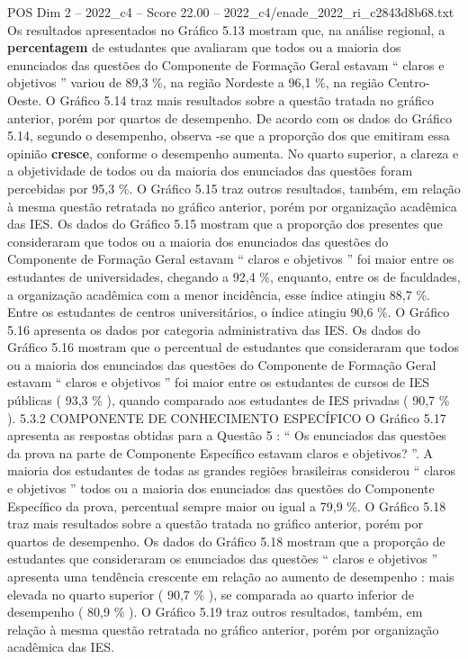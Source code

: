 \begin{textsample}{POS Dim 2 – 2022\_c4 – Score 22.00 – 2022\_c4/enade\_2022\_ri\_c2843d8b68.txt}
Os resultados apresentados no Gráfico 5.13 mostram que, na análise regional, a \textbf{percentagem} de estudantes que avaliaram que todos ou a maioria dos enunciados das questões do Componente de Formação Geral estavam “ claros e objetivos ” variou de 89,3 \%, na região Nordeste a 96,1 \%, na região Centro-Oeste.
O Gráfico 5.14 traz mais resultados sobre a questão tratada no gráfico anterior, porém por quartos de desempenho.
De acordo com os dados do Gráfico 5.14, segundo o desempenho, observa -se que a proporção dos que emitiram essa opinião \textbf{cresce}, conforme o desempenho aumenta.
No quarto superior, a clareza e a objetividade de todos ou da maioria dos enunciados das questões foram percebidas por 95,3 \%.
O Gráfico 5.15 traz outros resultados, também, em relação à mesma questão retratada no gráfico anterior, porém por organização acadêmica das IES.
Os dados do Gráfico 5.15 mostram que a proporção dos presentes que consideraram que todos ou a maioria dos enunciados das questões do Componente de Formação Geral estavam “ claros e objetivos ” foi maior entre os estudantes de universidades, chegando a 92,4 \%, enquanto, entre os de faculdades, a organização acadêmica com a menor incidência, esse índice atingiu 88,7 \%.
Entre os estudantes de centros universitários, o índice atingiu 90,6 \%.
O Gráfico 5.16 apresenta os dados por categoria administrativa das IES.
Os dados do Gráfico 5.16 mostram que o percentual de estudantes que consideraram que todos ou a maioria dos enunciados das questões do Componente de Formação Geral estavam “ claros e objetivos ” foi maior entre os estudantes de cursos de IES públicas ( 93,3 \% ), quando comparado aos estudantes de IES privadas ( 90,7 \% ). 5.3.2 COMPONENTE DE CONHECIMENTO ESPECÍFICO O Gráfico 5.17 apresenta as respostas obtidas para a Questão 5 : “ Os enunciados das questões da prova na parte de Componente Específico estavam claros e objetivos? ”.
A maioria dos estudantes de todas as grandes regiões brasileiras considerou “ claros e objetivos ” todos ou a maioria dos enunciados das questões do Componente Específico da prova, percentual sempre maior ou igual a 79,9 \%.
O Gráfico 5.18 traz mais resultados sobre a questão tratada no gráfico anterior, porém por quartos de desempenho.
Os dados do Gráfico 5.18 mostram que a proporção de estudantes que consideraram os enunciados das questões “ claros e objetivos ” apresenta uma tendência crescente em relação ao aumento de desempenho : mais elevada no quarto superior ( 90,7 \% ), se comparada ao quarto inferior de desempenho ( 80,9 \% ).
O Gráfico 5.19 traz outros resultados, também, em relação à mesma questão retratada no gráfico anterior, porém por organização acadêmica das IES.

\end{textsample}
